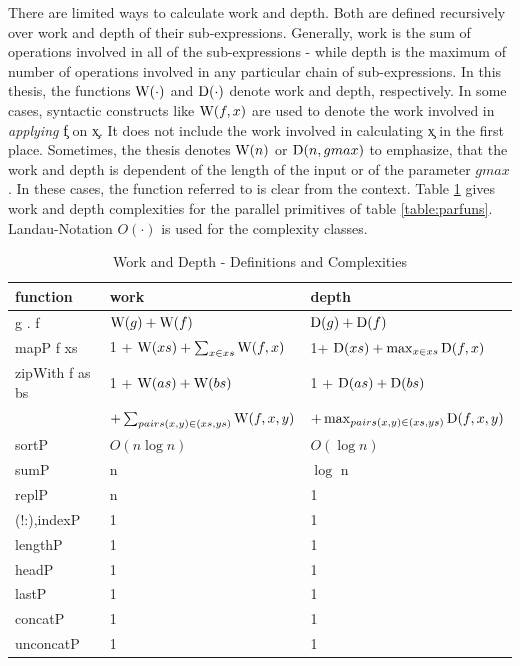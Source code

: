   There are limited ways to calculate work and depth. Both are defined
  recursively over work and depth of their sub-expressions. Generally,
  work is the sum of operations involved in all of the sub-expressions
  - while depth is the maximum of number of operations involved in
  any particular chain of sub-expressions.
  In this thesis, the functions $\textrm{W}(\cdot)$ and $\textrm{D}(\cdot)$ denote work
  and depth, respectively. In some cases, syntactic constructs
  like $\textrm{W}(f,x)$ are used to denote the work involved in \emph{applying}
  \c{f} on \c{x}. It does not include the work involved
  in calculating \c{x} in the first place. Sometimes,
  the thesis denotes $\textrm{W}(n)$ or $\textrm{D}(n,gmax)$ to emphasize,
  that the work and depth is dependent of the length of the input
  or of the parameter $gmax$. In these cases, the function referred to
  is clear from the context.
  Table \ref{table:workdepth} gives work and depth complexities for the parallel primitives
  of table \ref{table:parfuns}. Landau-Notation $O(\cdot)$ is used for
  the complexity classes.
  
  \begin{table}[h]
    \caption{Work and Depth - Definitions and Complexities}
    \label{table:workdepth}
    \begin{center}
    \begin{tabular}{lll}
      \toprule
      function & work & depth \\
      \midrule
      g . f & $\textrm{W}(g) + \textrm{W}(f)$ & $\textrm{D}(g) + \textrm{D}(f)$ \\
      mapP f xs & 1 + $\textrm{W}(xs) + \sum_{x \in xs}\textrm{W}(f,x)$ & 1+ $\textrm{D}(xs) + \max_{x \in xs}\textrm{D}(f,x)$ \\
      zipWith f as bs & 1 + $\textrm{W}(as) + \textrm{W}(bs)$ & 1 + $\textrm{D}(as) + \textrm{D}(bs)$ \\
        & $+ \sum_{pairs (x,y) \in (xs,ys)}\textrm{W}(f,x,y)$ & $ + \max_{pairs (x,y) \in (xs,ys)}\textrm{D}(f,x,y)$ \\
      sortP & $O(n \log n)$ & $O(\log n)$ \\
      sumP & n & $\log$ n \\
      replP &  n & 1 \\
      (!:),indexP & 1 & 1 \\
      lengthP & 1 & 1 \\
      headP & 1 & 1 \\
      lastP & 1 & 1 \\
      concatP & 1 & 1 \\
      unconcatP & 1 & 1 \\
    \end{tabular}
    \end{center}
  \end{table}
  
